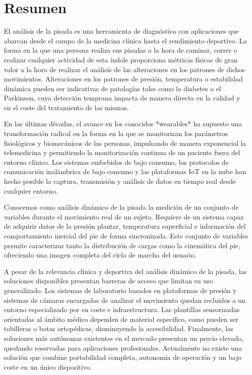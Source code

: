 \chapter*{Resumen}
El análisis de la pisada es una herramienta de diagnóstico con aplicaciones que abarcan desde el campo de la medicina clínica hasta el rendimiento deportivo. La forma en la que una persona realiza sus pisadas a la hora de caminar, correr o realizar cualquier actividad de esta índole proporciona métricas físicas de gran valor a la hora de realizar el análisis de las alteraciones en los patrones de dichos movimientos. Alteraciones en los patrones de presión, temperatura o estabilidad dinámica pueden ser indicativas de patologías tales como la diabetes o el Parkinson, cuya detección temprana impacta de manera directa en la calidad y en el coste del tratamiento de las mismas.

En las últimas décadas, el avance en los conocidos *wearables* ha supuesto una transformación radical en la forma en la que se monitorizan los parámetros fisiológicos y biomecánicos de las personas, impulsando de manera exponencial la telemedicina y permitiendo la monitorización continua de un paciente fuera del entorno clínico. Los sistemas embebidos de bajo consumo, los protocolos de comunicación inalámbrica de bajo consumo y las plataformas IoT en la nube han hecho posible la captura, transmisión y análisis de datos en tiempo real desde cualquier entorno.

Conocemos como análisis dinámico de la pisada la medición de un conjunto de variables durante el movimiento real de un sujeto. Requiere de un sistema capaz de adquirir datos de la presión plantar, temperatura superficial e información del comportamiento inercial del pie de forma sincronizada. Este conjunto de variables permite caracterizar tanto la distribución de cargas como la cinemática del pie, ofreciendo una imagen completa del ciclo de marcha del usuario.

A pesar de la relevancia clínica y deportiva del análisis dinámico de la pisada, las soluciones disponibles presentan barreras de acceso que limitan su uso generalizado. Los sistemas de laboratorio basados en plataformas de presión y sistemas de cámaras encargadas de analizar el movimiento quedan recluidos a un entorno especializado por su coste e infraestructura. Las plantillas sensorizadas orientadas al ámbito médico dependen de material específico, como pueden ser tobilleras o botas ortopédicas, disminuyendo la accesibilidad. Finalmente, las soluciones más autónomas existentes en el mercado presentan un precio elevado, quedando reservadas para aplicaciones profesionales. Actualmente no existe una solución que combine portabilidad completa, autonomía de operación y un bajo coste en un único dispositivo.

